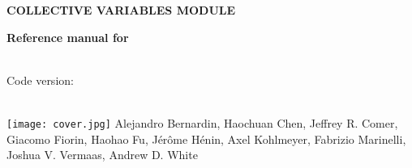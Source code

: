 \documentclass[11pt]{article}
\begin{document}
\ifdefined\HCode

\fi



\ifdefined\HCode
{}
\fi

\begin{titlepage}

  \noindent\colorbox{background-color}{
    \begin{minipage}{1.0\textwidth}

        $\,$\\

        \noindent\textsf{\bfseries\Huge COLLECTIVE VARIABLES MODULE\\}

        \noindent\textsf{\bfseries\Huge Reference manual for \MDENGINE{} }

        \noindent\textsf{\\Code version: \cvversion\\}

      \end{minipage}}

  \ifdefined\HCode
  \\
  \else
  \texttt{[image: cover.jpg]}
  \fi
  \textsf{\large Alejandro Bernardin, Haochuan Chen, Jeffrey R.{} Comer, Giacomo Fiorin, Haohao Fu, J\'er\^ome H\'enin, Axel Kohlmeyer, Fabrizio Marinelli, Joshua V.{} Vermaas, Andrew D.{} White}
\end{titlepage}

\newpage
\tableofcontents
\newpage


\newcommand{\key}[5]{%
  \index{#2!\texttt{#1}}
  {\bf Keyword \large \tt #1} $\langle\,$#3$\,\rangle$ \\%
  {\bf Context: } #2 \\%
  {\bf Acceptable values: } #4 \\%
  {\bf Description: } #5%
}
\newcommand{\keydef}[6]{%
  \index{#2!\texttt{#1}}
  {\bf Keyword \large \tt #1} $\langle\,$#3$\,\rangle$ \\%
  {\bf Context: } #2 \\%
  {\bf Acceptable values: } #4 \\%
  {\bf Default value: } #5 \\%
  {\bf Description: } #6
}
\newcommand{\labelkey}[1]{\hypertarget{#1}{~}\label{#1}}
\newcommand{\refkey}[2]{\hyperlink{#2}{\texttt{#1}}}
\newcommand{\dupkey}[4]{%
  \index{#2!\texttt{#1}}
  {\bf Keyword \large \tt #1:} see definition of \hyperlink{#3}{\texttt{#1}} (#4)%
}
\newcommand{\simkey}[3]{%
  \index{#2!\texttt{#1}}
  {\bf Keyword \large \tt #1:} analogous to \texttt{#3}%
}
\end{document}
